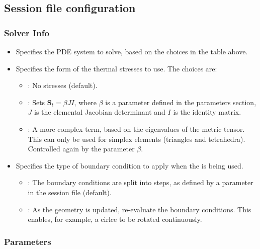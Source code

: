 \subsection{Session file configuration}
\subsubsection{Solver Info}
\begin{itemize}
  \item {} Specifies the PDE system to solve, based on the choices
  in the table above.
  \item {} Specifies the form of the thermal stresses to
  use. The choices are:
  \begin{itemize}
    \item {}: No stresses (default).
    \item {}: Sets $\mathbf{S}_t = \beta JI$, where $\beta$ is a
    parameter defined in the parameters section, $J$ is the elemental Jacobian
    determinant and $I$ is the identity matrix.
    \item {}: A more complex term, based on the eigenvalues of the
    metric tensor. This can only be used for simplex elements (triangles and
    tetrahedra). Controlled again by the parameter $\beta$.
  \end{itemize}
  \item {} Specifies the type of boundary condition to apply when
  the  is being used.
  \begin{itemize}
    \item {}: The boundary conditions are split into
     steps, as defined by a parameter in the session file
    (default).
    \item {}: As the geometry is updated, re-evaluate the boundary
    conditions. This enables, for example, a cirlce to be rotated continuously.
  \end{itemize}
\end{itemize}

\subsubsection{Parameters}

